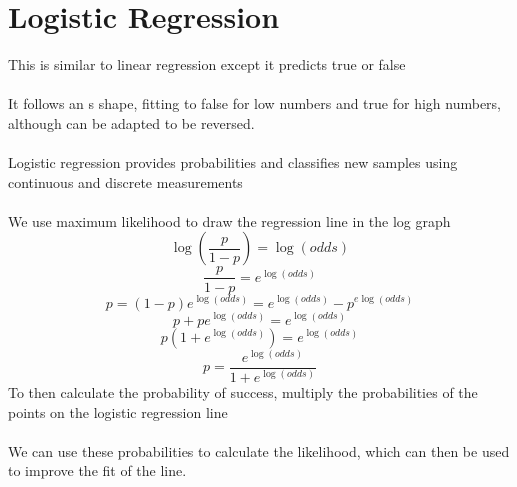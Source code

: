 \documentclass{article}[18pt]
\begin{document}
\section{Logistic Regression}
This is similar to linear regression except it predicts true or false\\
\\
It follows an s shape, fitting to false for low numbers and true for high numbers, although can be adapted to be reversed.\\
\\
Logistic regression provides probabilities and classifies new samples using continuous and discrete measurements\\
\\
We use maximum likelihood to draw the regression line in the log graph
\newpage
$$\log(\frac{p}{1-p})=\log(odds)$$
$$\dfrac{p}{1-p}=e^{\log(odds)}$$
$$p=(1-p)e^{\log(odds)}=e^{\log(odds)}-p^{e\log(odds)}$$
$$p+pe^{\log(odds)}=e^{\log(odds)}$$
$$p(1+e^{\log(odds)})=e^{\log(odds)}$$
$$p=\dfrac{e^{\log(odds)}}{1+e^{\log(odds)}}$$
To then calculate the probability of success, multiply the probabilities of the points on the logistic regression line\\
\\
We can use these probabilities to calculate the likelihood, which can then be used to improve the fit of the line.
\end{document}
